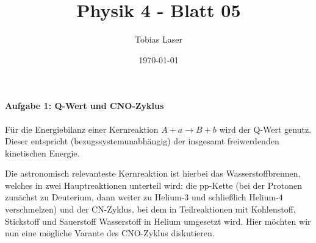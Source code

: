 \documentclass[11pt,a4paper]{scrartcl}
\begin{document}
    \title{Physik 4 - Blatt 05}
    \author{Tobias Laser}
    \date{\today}
    \maketitle
    \vfill
    \thispagestyle{empty}


    \paragraph{Aufgabe 1: Q-Wert und CNO-Zyklus}

        Für die Energiebilanz einer Kernreaktion $A + a \rightarrow B + b$ wird der Q-Wert genutz. Dieser entspricht (bezugssystemunabhängig) der insgesamt freiwerdenden kinetischen Energie.

        Die astronomisch relevanteste Kernreaktion ist hierbei das Wasserstoffbrennen, welches in zwei Hauptreaktionen unterteil wird: die pp-Kette (bei der Protonen zunächst zu Deuterium, dann weiter zu Helium-3 und schließlich Helium-4 verschmelzen) und der CN-Zyklus, bei dem in Teilreaktionen mit Kohlenstoff, Stickstoff und Sauerstoff Wasserstoff in Helium umgesetzt wird. Hier möchten wir nun eine mögliche Varante des CNO-Zyklus diskutieren.
\end{document}
